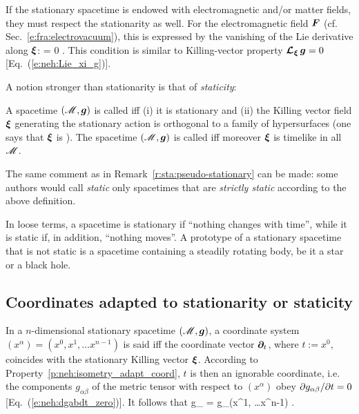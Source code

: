 If the stationary spacetime is endowed with electromagnetic and/or
matter fields, they must respect the stationarity as well. For the electromagnetic
field $\bm{F}$ (cf. Sec.~\ref{e:fra:electrovacuum}), this is expressed by
the vanishing of the Lie derivative along $\bm{\xi}$:
\be
    \Lie{\xi}  = 0 .
\ee
This condition is similar to Killing-vector property
$\bm{\mathcal{L}}_{\bm{\xi}}\, \bm{g} = 0$ [Eq.~(\ref{e:neh:Lie_xi_g})].

A notion stronger than stationarity is that of \emph{staticity}:

\begin{greybox}
A spacetime $(\mathscr{M},\bm{g})$ is called 
iff (i) it is stationary and (ii) the Killing vector field $\bm{\xi}$
generating the stationary action is orthogonal to a family of hypersurfaces
(one says that $\bm{\xi}$ is ).
The spacetime $(\mathscr{M},\bm{g})$ is called 
iff moreover $\bm{\xi}$ is timelike in all $\mathscr{M}$.
\end{greybox}

\begin{remark}
The same comment as in Remark~\ref{r:sta:pseudo-stationary} can be made: some authors
would call \emph{static} only spacetimes that are
\emph{strictly static} according to the above definition.
\end{remark}

In loose terms, a spacetime is stationary if ``nothing changes with time'', while
it is static if, in addition, ``nothing moves''. A prototype of a stationary
spacetime that is not static is a spacetime containing a steadily rotating
body, be it a star or a black hole.


\subsection{Coordinates adapted to stationarity or staticity}

In a $n$-dimensional stationary spacetime $(\mathscr{M},\bm{g})$, a coordinate system $(x^\alpha) = (x^0, x^1, \ldots  x^{n-1})$
is said  iff the coordinate vector
$\bm{\partial}_t$, where $t := x^0$, coincides with the stationary Killing vector $\bm{\xi}$.
According to Property~\ref{p:neh:isometry_adapt_coord}, $t$ is then an
ignorable coordinate, i.e. the
components $g_{\alpha\beta}$ of the metric tensor with respect to $(x^\alpha)$ obey ${\partial g_{\alpha\beta}}/{\partial t} = 0$
[Eq.~(\ref{e:neh:dgabdt_zero})]. It follows that
\be
   g_{\alpha\beta}  = g_{\alpha\beta}(x^1, \ldots  x^{n-1}) .
\ee

